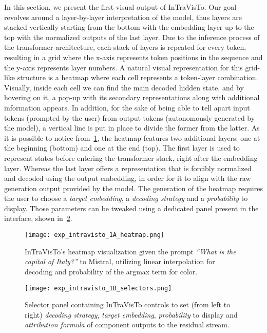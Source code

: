 In this section, we present the first visual output of InTraVisTo.
Our goal revolves around a layer-by-layer interpretation of the model, thus layers are stacked vertically starting from the bottom with the embedding layer up to the top with the normalized outputs of the last layer.
Due to the inference process of the transformer architecture, each stack of layers is repeated for every token, resulting in a grid where the x-axis represents token positions in the sequence and the y-axis represents layer numbers.
A natural visual representation for this grid-like structure is a heatmap where each cell represents a token-layer combination.
Visually, inside each cell we can find the main decoded hidden state, and by hovering on it, a pop-up with its secondary representations along with additional information appears.
In addition, for the sake of being able to tell apart input tokens (prompted by the user) from output tokens (autonomously generated by the model), a vertical line is put in place to divide the former from the latter.
As it is possible to notice from~\cref{fig:exp_intravisto_1_A}, the heatmap features two additional layers: one at the beginning (bottom) and one at the end (top).
The first layer is used to represent states before entering the transformer stack, right after the embedding layer.
Whereas the last layer offers a representation that is forcibly normalized and decoded using the output embedding, in order for it to align with the raw generation output provided by the model.
The generation of the heatmap requires the user to choose a \emph{target embedding}, a \emph{decoding strategy} and a \emph{probability} to display.
Those parameters can be tweaked using a dedicated panel present in the interface, shown in~\cref{fig:exp_intravisto_1_B}.

\begin{figure}[t!]
    \centering
    \texttt{[image: exp\_intravisto\_1A\_heatmap.png]}
    \caption[InTraVisTo's heatmap visualization given the prompt \emph{``What is the capital of Italy?''} to Mistral.]{InTraVisTo's heatmap visualization given the prompt \emph{``What is the capital of Italy?''} to Mistral, utilizing linear interpolation for decoding and probability of the argmax term for color.}
    \label{fig:exp_intravisto_1_A}
\end{figure}

\begin{figure}[t!]
    \centering
    \texttt{[image: exp\_intravisto\_1B\_selectors.png]}
    \caption[Selector panel containing InTraVisTo controls.]{Selector panel containing InTraVisTo controls to set (from left to right) \emph{decoding strategy}, \emph{target embedding}, \emph{probability} to display and \emph{attribution formula} of component outputs to the residual stream.}
    \label{fig:exp_intravisto_1_B}
\end{figure}

